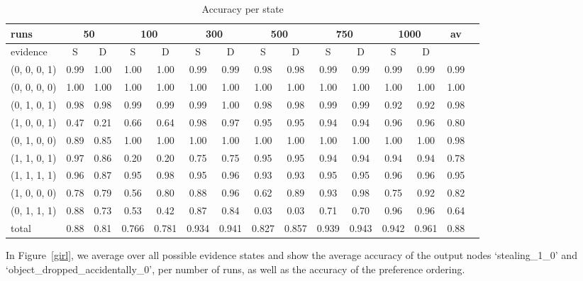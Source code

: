\documentclass[12pt]{article}
\begin{document}
\begin{table}[htbp]
\footnotesize
\centering
\begin{tabular}{|l|c|c|c|c|c|c|c|c|c|c|c|c|c|c|}
\hline
	runs				&	\multicolumn{2}{|c|}{50}  &	\multicolumn{2}{|c|}{100}	&	\multicolumn{2}{|c|}{300} &	\multicolumn{2}{|c|}{500}	&	\multicolumn{2}{|c|}{750}&	\multicolumn{2}{|c|}{1000}	 & 	av	\\
\hline
	evidence						&	S	&	D	&	S	&	D	&	S	&	D	&	S	&	D	&	S	&	D	&	S	&	D	&		\\
\hline
(0, 	0, 	0, 	1) 				& 	0.99 & 1.00&	1.00 & 1.00	&	0.99 & 0.99	& 	0.98 & 0.98	& 	0.99 & 0.99	& 	0.99 & 0.99 & 0.99	\\
(0, 	0, 	0, 	0) 				& 	1.00 & 1.00&	1.00 & 1.00	&	1.00 & 1.00	& 	1.00 & 1.00	& 	1.00 & 1.00	& 	1.00 & 1.00& 1.00	\\
(0, 	1, 	0, 	1) 				& 	0.98 & 0.98&	0.99 & 0.99	&	0.99 & 1.00	& 	0.98 & 0.98	& 	0.99 & 0.99	& 	0.92 & 0.92& 0.98	\\
(1, 	0, 	0, 	1) 				& 	0.47 & 0.21&	0.66 & 0.64	&	0.98 & 0.97	& 	0.95 & 0.95	& 	0.94 & 0.94	& 	0.96 & 0.96& 0.80	\\
(0, 	1, 	0, 	0) 				& 	0.89 & 0.85&	1.00 & 1.00	&	1.00 & 1.00	& 	1.00 & 1.00	& 	1.00 & 1.00	& 	1.00 & 1.00& 0.98	\\
(1, 	1, 	0, 	1) 				& 	0.97 & 0.86&	0.20 & 0.20	&	0.75 & 0.75	& 	0.95 & 0.95	& 	0.94 & 0.94	& 	0.94 & 0.94& 0.78	\\
(1, 	1, 	1, 	1) 				& 	0.96 & 0.87&	0.95 & 0.98	&	0.95 & 0.96	& 	0.93 & 0.93	& 	0.95 & 0.95	& 	0.96 & 0.96& 0.95	\\
(1, 	0, 	0, 	0) 				& 	0.78 & 0.79&	0.56 & 0.80	&	0.88 & 0.96	& 	0.62 & 0.89	& 	0.93 & 0.98	& 	0.75 & 0.92& 0.82	\\
(0, 	1, 	1, 	1) 				& 	0.88 & 0.73&	0.53 & 0.42	&	0.87 & 0.84	& 	0.03 & 0.03	& 	0.71 & 0.70	& 	0.96 & 0.96& 0.64	\\
\hline
total    						& 	0.88 &  0.81 & 0.766 &  0.781 &    0.934 &  0.941   &     0.827 &  0.857 &    0.939 &  0.943 &     0.942 &  0.961   & 0.88 \\
\hline
\end{tabular}
\caption{Accuracy per state}
\label{eye}
\end{table}

In Figure~\ref{girl}, we average over all possible evidence states and show the average accuracy of the output nodes `stealing\_1\_0' and `object\_dropped\_accidentally\_0', per number of runs, as well as the accuracy of the preference ordering. 
\end{document}
